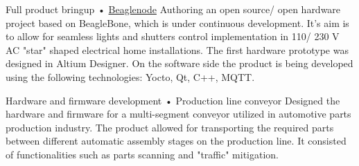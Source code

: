 \documentclass{tccv}
\begin{document}
\begin{yearlist}
\item[Full product bringup]{•}
     {\href{https://github.com/bremenpl/BeagleNodeHW}{Beaglenode}}
     {Authoring an open source/ open hardware project based on BeagleBone, which is under continuous development. It's aim is to allow for seamless lights and shutters control implementation in 110/ 230 V AC "star" shaped electrical home installations. The first hardware prototype was designed in Altium Designer. On the software side the product is being developed using the following technologies: Yocto, Qt, C++, MQTT.} 

\item[Hardware and firmware development]{•}
     {Production line conveyor}
     {Designed the hardware and firmware for a multi-segment conveyor utilized in automotive parts production industry. The product allowed for transporting the required parts between different automatic assembly stages on the production line. It consisted of functionalities such as parts scanning and "traffic" mitigation.}  

\end{yearlist}
\end{document}
